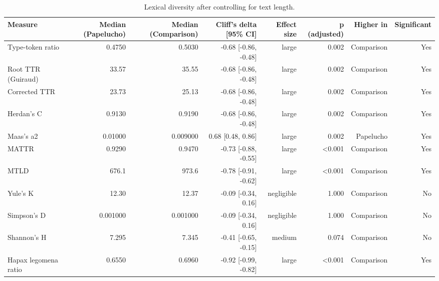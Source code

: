 \begin{table}[htbp]
\centering
\small
\caption{Lexical diversity after controlling for text length.}
\label{tab:lexical-controlled}
\begin{tabular}{lrrrrrrr}
\toprule
\textbf{Measure} & \textbf{Median (Papelucho)} & \textbf{Median (Comparison)} & \textbf{Cliff's delta [95\% CI]} & \textbf{Effect size} & \textbf{p (adjusted)} & \textbf{Higher in} & \textbf{Significant} \\
\midrule
Type-token ratio & 0.4750 & 0.5030 & -0.68 [-0.86, -0.48] & large & 0.002 & Comparison & Yes \\
Root TTR (Guiraud) & 33.57 & 35.55 & -0.68 [-0.86, -0.48] & large & 0.002 & Comparison & Yes \\
Corrected TTR & 23.73 & 25.13 & -0.68 [-0.86, -0.48] & large & 0.002 & Comparison & Yes \\
Herdan's C & 0.9130 & 0.9190 & -0.68 [-0.86, -0.48] & large & 0.002 & Comparison & Yes \\
Maas's a2 & 0.01000 & 0.009000 & 0.68 [0.48, 0.86] & large & 0.002 & Papelucho & Yes \\
MATTR & 0.9290 & 0.9470 & -0.73 [-0.88, -0.55] & large & <0.001 & Comparison & Yes \\
MTLD & 676.1 & 973.6 & -0.78 [-0.91, -0.62] & large & <0.001 & Comparison & Yes \\
Yule's K & 12.30 & 12.37 & -0.09 [-0.34, 0.16] & negligible & 1.000 & Comparison & No \\
Simpson's D & 0.001000 & 0.001000 & -0.09 [-0.34, 0.16] & negligible & 1.000 & Comparison & No \\
Shannon's H & 7.295 & 7.345 & -0.41 [-0.65, -0.15] & medium & 0.074 & Comparison & No \\
Hapax legomena ratio & 0.6550 & 0.6960 & -0.92 [-0.99, -0.82] & large & <0.001 & Comparison & Yes \\
\bottomrule
\end{tabular}
\end{table}

